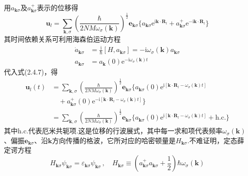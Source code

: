 用$a_{\boldsymbol{k}\sigma}$及$a_{\boldsymbol{k}\sigma}^{+}$表示的位移得
\begin{equation}
  \boldsymbol{u}_l=\sum_{\boldsymbol{k},\sigma}
  \left(\frac{\hbar}{2NM\omega_{\sigma}(\boldsymbol{k})}\right)^{\frac{1}{2}}
  \boldsymbol{e}_{\boldsymbol{k}\sigma}
  \bigl\{a_{\boldsymbol{k}\sigma}\mathrm{e}^{\mathrm{i}\boldsymbol{k}\cdot\boldsymbol{R}_l}
  +a_{\boldsymbol{k}\sigma}^{+}\mathrm{e}^{-\mathrm{i}\boldsymbol{k}\cdot\boldsymbol{R}_l}\bigr\}
\end{equation}
其时间依赖关系可利用海森伯运动方程
\begin{equation*}
\begin{aligned}
  \dot{a}_{\boldsymbol{k}\sigma}&=\frac{\mathrm{i}}{\hbar}[H,a_{\boldsymbol{k}\sigma}]
  =-\mathrm{i}\omega_{\sigma}(\boldsymbol{k})a_{\boldsymbol{k}\sigma}\\
  a_{\boldsymbol{k}\sigma}&=a_{\boldsymbol{k}}(0)\mathrm{e}^{-\mathrm{i}\omega_{\sigma}(\boldsymbol{k})t}
\end{aligned}
\end{equation*}
代入式(2.4.7)，得
\begin{equation*}
\begin{aligned}
  \boldsymbol{u}_l(t)&=\sum_{\boldsymbol{k},\sigma}
  \left(\frac{\hbar}{2NM\omega_{\sigma}(\boldsymbol{k})}\right)^{\frac{1}{2}}
  \boldsymbol{e}_{\boldsymbol{k}\sigma}
  \bigl\{a_{\boldsymbol{k}\sigma}(0)
  \mathrm{e}^{\mathrm{i}[\boldsymbol{k}\cdot\boldsymbol{R}_l-\omega_{\sigma}(\boldsymbol{k})t]}\\
  &\quad+a_{\boldsymbol{k}\sigma}^{+}(0)
  \mathrm{e}^{-\mathrm{i}[\boldsymbol{k}\cdot\boldsymbol{R}_l-\omega_{\sigma}(\boldsymbol{k})t]}\bigr\}\\
  &=\sum_{\boldsymbol{k},\sigma}
  \left(\frac{\hbar}{2NM\omega_{\sigma}(\boldsymbol{k})}\right)^{\frac{1}{2}}
  \boldsymbol{e}_{\boldsymbol{k}\sigma}\bigl\{a_{\boldsymbol{k}\sigma}(0)
  \mathrm{e}^{\mathrm{i}[\boldsymbol{k}\cdot\boldsymbol{R}_l-\omega_{\sigma}(\boldsymbol{k})t]}
  +\mathrm{h.c.}\bigr\}
\end{aligned}
\end{equation*}
其中h.c.代表厄米共轭项.这是位移的行波展式，其中每一求和项代表频率$\omega_{\sigma}(\boldsymbol{k})$、偏振$\boldsymbol{e}_{\boldsymbol{k}\sigma}$、沿$\boldsymbol{k}$方向传播的格波，它所对应的哈密顿量是$H_{\boldsymbol{k}\sigma}$.不难证明，定态薛定谔方程
\begin{equation}
  H_{\boldsymbol{k}\sigma}\psi_{\boldsymbol{k}\sigma}
  =\varepsilon_{\boldsymbol{k}\sigma}\psi_{\boldsymbol{k}\sigma}\,,
  \quad H_{\boldsymbol{k}\sigma}\equiv
  \left(a_{\boldsymbol{k}\sigma}^{+}a_{\boldsymbol{k}\sigma}+\frac{1}{2}\right)
  \hbar\omega_{\sigma}(\boldsymbol{k})
\end{equation}
